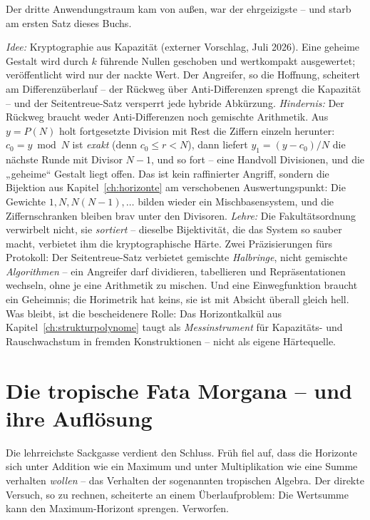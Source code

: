 Der dritte Anwendungstraum kam von außen, war der ehrgeizigste --
und starb am ersten Satz dieses Buchs.

\begin{sackgasse}
\emph{Idee:} Kryptographie aus Kapazität (externer Vorschlag,
Juli 2026). Eine geheime Gestalt wird durch $k$ führende Nullen
geschoben und wertkompakt ausgewertet; veröffentlicht wird nur der
nackte Wert. Der Angreifer, so die Hoffnung, scheitert am
Differenzüberlauf -- der Rückweg über Anti-Differenzen sprengt die
Kapazität -- und der Seitentreue-Satz versperrt jede hybride
Abkürzung.
\emph{Hindernis:} Der Rückweg braucht weder Anti-Differenzen noch
gemischte Arithmetik. Aus $y=P(N)$ holt fortgesetzte Division mit
Rest die Ziffern einzeln herunter: $c_0=y\bmod N$ ist \emph{exakt}
(denn $c_0\le r<N$), dann liefert $y_1=(y-c_0)/N$ die nächste Runde
mit Divisor $N{-}1$, und so fort -- eine Handvoll Divisionen, und
die „geheime“ Gestalt liegt offen. Das ist kein raffinierter
Angriff, sondern die Bijektion aus Kapitel~\ref{ch:horizonte} am
verschobenen Auswertungspunkt: Die Gewichte $1,N,N(N{-}1),\ldots$
bilden wieder ein Mischbasensystem, und die Ziffernschranken
bleiben brav unter den Divisoren.
\emph{Lehre:} Die Fakultätsordnung verwirbelt nicht, sie
\emph{sortiert} -- dieselbe Bijektivität, die das System so sauber
macht, verbietet ihm die kryptographische Härte. Zwei
Präzisierungen fürs Protokoll: Der Seitentreue-Satz verbietet
gemischte \emph{Halbringe}, nicht gemischte \emph{Algorithmen} --
ein Angreifer darf dividieren, tabellieren und Repräsentationen
wechseln, ohne je eine Arithmetik zu mischen. Und eine
Einwegfunktion braucht ein Geheimnis; die Horimetrik hat keins, sie
ist mit Absicht überall gleich hell. Was bleibt, ist die
bescheidenere Rolle: Das Horizontkalkül aus
Kapitel~\ref{ch:strukturpolynome} taugt als \emph{Messinstrument}
für Kapazitäts- und Rauschwachstum in fremden Konstruktionen --
nicht als eigene Härtequelle.
\end{sackgasse}

\section{Die tropische Fata Morgana -- und ihre Auflösung}

Die lehrreichste Sackgasse verdient den Schluss. Früh fiel auf,
dass die Horizonte sich unter Addition wie ein Maximum und unter
Multiplikation wie eine Summe verhalten \emph{wollen} -- das
Verhalten der sogenannten tropischen Algebra. Der direkte Versuch,
so zu rechnen, scheiterte an einem Überlaufproblem: Die Wertsumme
kann den Maximum-Horizont sprengen. Verworfen.

